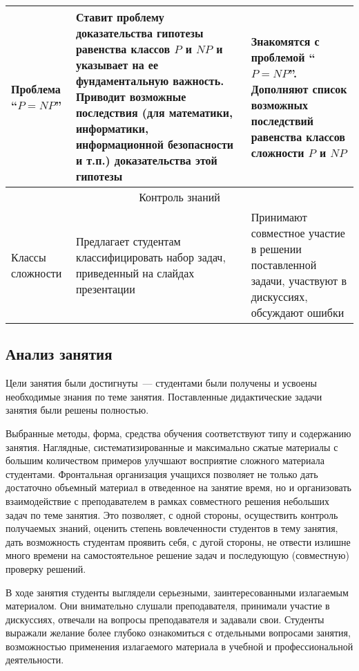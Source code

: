 \begin{refsection}
\begin{longtable}{| p{} | p{} | p{} |}
    {Проблема \enquote{$P = NP$}} &
    {Ставит проблему доказательства гипотезы равенства классов $P$ и $NP$ и указывает на ее фундаментальную важность. Приводит возможные последствия (для математики, информатики, информационной безопасности и т.п.) доказательства этой гипотезы} &
    {Знакомятся с проблемой \enquote{$P = NP$}. Дополняют список возможных последствий равенства классов сложности $P$ и $NP$} \\ \hline

    \multicolumn{3}{|c|}{Контроль знаний} \\ \hline

    {Классы сложности} &
    {Предлагает студентам классифицировать набор задач, приведенный на слайдах презентации} &
    {Принимают совместное участие в решении поставленной задачи, участвуют в дискуссиях, обсуждают ошибки} \\ \hline
\end{longtable}

\subsection{Анализ занятия}

    Цели занятия были достигнуты~--- студентами были получены и усвоены необходимые знания по теме занятия. Поставленные дидактические задачи занятия были решены полностью.

    Выбранные методы, форма, средства обучения соответствуют типу и содержанию занятия. Наглядные, систематизированные и максимально сжатые материалы с большим количеством примеров улучшают восприятие сложного материала студентами. Фронтальная организация учащихся позволяет не только дать достаточно объемный материал в отведенное на занятие время, но и организовать взаимодействие с преподавателем в рамках совместного решения небольших задач по теме занятия. Это позволяет, с одной стороны, осуществить контроль получаемых знаний, оценить степень вовлеченности студентов в тему занятия, дать возможность студентам проявить себя, с дугой стороны, не отвести излишне много времени на самостоятельное решение задач и последующую (совместную) проверку решений.

    В ходе занятия студенты выглядели серьезными, заинтересованными излагаемым материалом. Они внимательно слушали преподавателя, принимали участие в дискуссиях, отвечали на вопросы преподавателя и задавали свои. Студенты выражали желание более глубоко ознакомиться с отдельными вопросами занятия, возможностью применения излагаемого материала в учебной и профессиональной деятельности.


\end{refsection}
